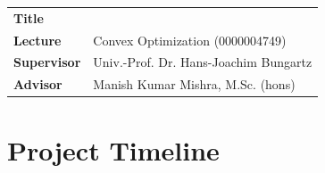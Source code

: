 \documentclass[11pt,parskip=full+]{scrartcl}
\begin{document}
\begin{table}[htpb]
	\noindent
	\begin{tabularx}{\textwidth}{@{}p{3.5cm} X@{}}
		\textbf{\textsf{Title}}      & \thetitle{}                                                                     \\
		\textbf{\textsf{Lecture}}    & Convex Optimization (0000004749)                                                \\
		\textbf{\textsf{Supervisor}} & Univ.-Prof. Dr. Hans-Joachim Bungartz                                           \\
		\textbf{\textsf{Advisor}}    & Manish Kumar Mishra, M.Sc. (hons)                                               \\
	\end{tabularx}
\end{table}

\section*{Project Timeline}
\vspace*{-1em}
\end{document}
